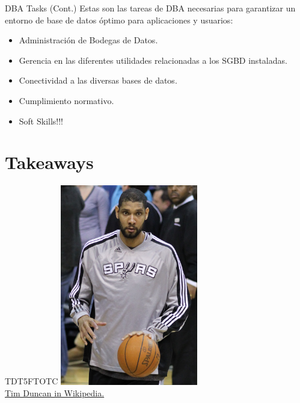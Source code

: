 \documentclass{beamer}
\begin{document}
\begin{frame}{DBA Tasks (Cont.)}
    \centering
    Estas son las tareas de DBA necesarias para garantizar un entorno de base de datos óptimo para aplicaciones y usuarios:
    \begin{itemize}
        \item Administración de Bodegas de Datos.
        \item Gerencia en las diferentes utilidades relacionadas a los SGBD instaladas.
        \item Conectividad a las diversas bases de datos.
        \item Cumplimiento normativo.
        \item Soft Skills!!!
    \end{itemize}
\end{frame}

\section*{Takeaways}

\begin{frame}{TDT5FTOTC}
    \centering
    \includegraphics[width=0.45\textwidth]{figures/td.jpg}\\
    \href{https://en.wikipedia.org/wiki/Tim_Duncan}{Tim Duncan in Wikipedia.}
\end{frame}
\end{document}
